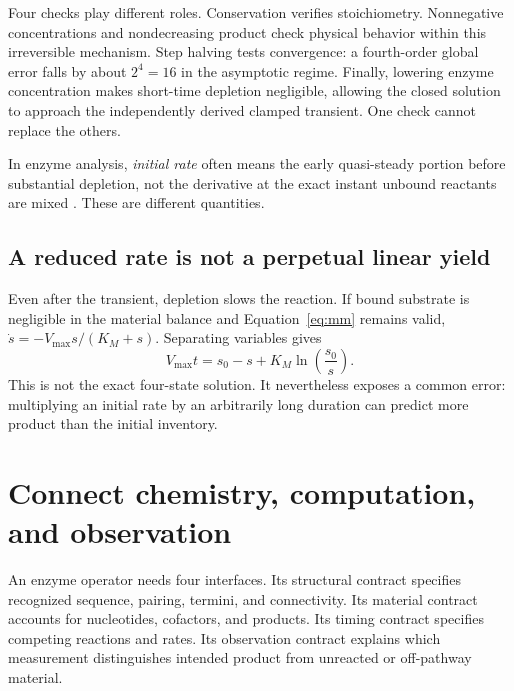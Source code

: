 
Four checks play different roles. Conservation verifies stoichiometry. Nonnegative concentrations and nondecreasing product check physical behavior within this irreversible mechanism. Step halving tests convergence: a fourth-order global error falls by about $2^4=16$ in the asymptotic regime. Finally, lowering enzyme concentration makes short-time depletion negligible, allowing the closed solution to approach the independently derived clamped transient. One check cannot replace the others.

In enzyme analysis, \emph{initial rate} often means the early quasi-steady portion before substantial depletion, not the derivative at the exact instant unbound reactants are mixed \cite{IUBMB1981}. These are different quantities.

\subsection{A reduced rate is not a perpetual linear yield}

Even after the transient, depletion slows the reaction. If bound substrate is negligible in the material balance and Equation~\ref{eq:mm} remains valid, $\dot s=-V_{\max}s/(K_M+s)$. Separating variables gives
\begin{equation}
V_{\max}t=s_0-s+K_M\ln\!\left(\frac{s_0}{s}\right).
\label{eq:integrated}
\end{equation}
This is not the exact four-state solution. It nevertheless exposes a common error: multiplying an initial rate by an arbitrarily long duration can predict more product than the initial inventory.

\section{Connect chemistry, computation, and observation}

An enzyme operator needs four interfaces. Its structural contract specifies recognized sequence, pairing, termini, and connectivity. Its material contract accounts for nucleotides, cofactors, and products. Its timing contract specifies competing reactions and rates. Its observation contract explains which measurement distinguishes intended product from unreacted or off-pathway material.

